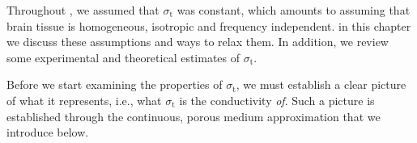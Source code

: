 

Throughout , we assumed that $\sigma_\text{t}$ was constant, 
which amounts to assuming that brain tissue is homogeneous, isotropic and frequency independent.
in this chapter we discuss these assumptions and ways to relax them.
In addition, we review some experimental and theoretical estimates of $\sigma_\text{t}$. 

Before we start examining the properties of $\sigma_\text{t}$, we must establish a clear picture
of what it represents, i.e., what $\sigma_\text{t}$ is the conductivity \textit{of}.
Such a picture is established through the continuous, porous medium approximation that we introduce below. 


